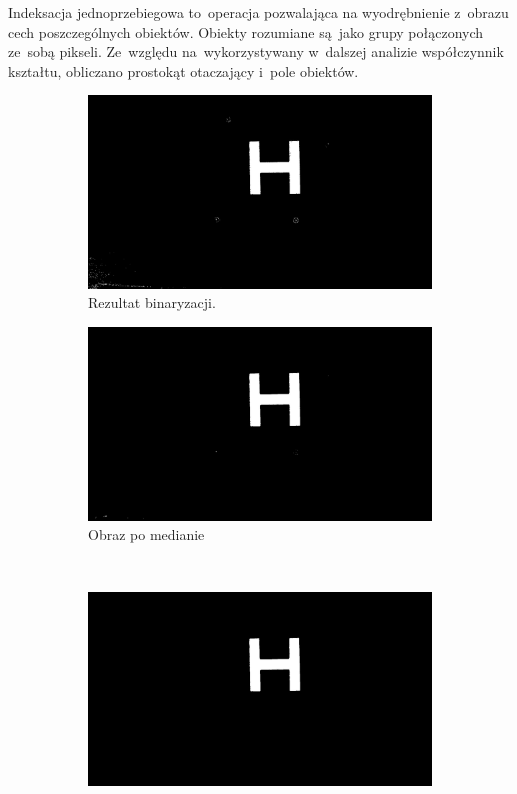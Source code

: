 Indeksacja jednoprzebiegowa to~operacja pozwalająca na wyodrębnienie z~obrazu cech poszczególnych obiektów. Obiekty rozumiane są~jako grupy połączonych ze~sobą pikseli. 
Ze~względu na~wykorzystywany w~dalszej analizie współczynnik kształtu, obliczano prostokąt otaczający i~pole obiektów. 

\begin{figure}
	\centering
	\begin{subfigure}{0.7\textwidth}
		\centering
		\includegraphics[width=\textwidth]{bin.jpg}
		\caption{Rezultat binaryzacji.}
		\label{fig:bin_1}
	\end{subfigure}
	\begin{subfigure}{0.7\textwidth}
		\centering
		\includegraphics[width=\textwidth]{median.jpg}
		\caption{Obraz po medianie}
		\label{fig:median_1}
	\end{subfigure}\\
	\begin{subfigure}{0.7\textwidth}
		\centering
		\includegraphics[width=\textwidth]{opened.jpg}

\end{subfigure}
\end{figure}
